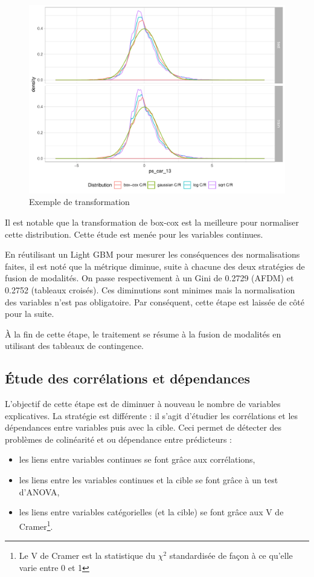 \documentclass[french]{article}
\begin{document}
\begin{multicols}{2}
\begin{figure}[H] \centering
  \includegraphics[width = \columnwidth]{img/ex_normalisation}
  \caption{Exemple de transformation}
\end{figure}

Il est notable que la transformation de box-cox est la meilleure pour normaliser cette distribution. Cette étude est menée pour les variables continues.

En réutilisant un Light GBM pour mesurer les conséquences des normalisations faites, il est noté que la métrique diminue, suite à chacune des deux stratégies de fusion de modalités. On passe respectivement à un Gini de 0.2729 (AFDM) et 0.2752 (tableaux croisés). Ces diminutions sont minimes mais la normalisation des variables n'est pas obligatoire. Par conséquent, cette étape est laissée de côté pour la suite. 

À la fin de cette étape, le traitement se résume à la fusion de modalités en utilisant des tableaux de contingence.

\subsection{Étude des corrélations et dépendances}

L'objectif de cette étape est de diminuer à nouveau le nombre de variables explicatives. La stratégie est différente : il s'agit d'étudier les corrélations et les dépendances entre variables puis avec la cible. Ceci permet de détecter des problèmes de colinéarité et ou dépendance entre prédicteurs :

\begin{itemize}
    \item les liens entre variables continues se font grâce aux corrélations,
    \item les liens entre les variables continues et la cible se font grâce à un test d'ANOVA,
    \item les liens entre variables catégorielles (et la cible) se font grâce aux V de Cramer\footnote{Le V de Cramer est la statistique du $\chi^2$ standardisée de façon à ce qu'elle varie entre 0 et 1}.
\end{itemize}


\end{multicols}
\end{document}
